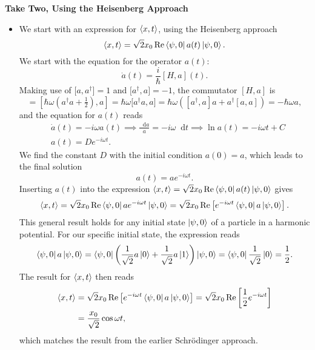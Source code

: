 \documentclass[11pt, a4paper]{article}
\newcommand{\diff}{\mathop{}\!\mathrm{d}} %
\newcommand{\Schro}{Schr\"{o}dinger\xspace}
\begin{document}
\textbf{Take Two, Using the Heisenberg Approach}
\begin{itemize}
	\item We start with an expression for $ \ev{x, t} $, using the Heisenberg approach
	\begin{equation*}
		\ev{x, t} = \sqrt{2}x_{0} \Re \bra{\psi, 0}a(t) \ket{\psi, 0}.
	\end{equation*}
	We start with the equation for the operator $ a(t) $: 
	\begin{equation*}
		\dot{a}(t) = \frac{i}{\hbar}[H, a](t).
	\end{equation*}
	Making use of $ \big[a, a^{\dagger}\big] = 1 $ and $ \big[ a^{\dagger}, a\big] = -1 $, the commutator $ [H, a] $ is
	\begin{equation*}
		[H, a] = [\hbar \omega (a^{\dagger}a + \tfrac{1}{2}), a] = \hbar \omega \big[a^{\dagger}a, a\big] = \hbar \omega \left([a^{\dagger}, a]a + a^{\dagger}[a, a]\right) = -\hbar \omega a,
	\end{equation*}
	and the equation for $ a(t) $ reads
	\begin{align*}
		&\dot{a}(t) = -i \omega a(t) \implies \frac{\diff a}{a} = -i\omega \diff t \implies \ln a(t) = -i\omega t + C\\
		&a(t) = De^{-i\omega t}.
	\end{align*}
	We find the constant $ D $ with the initial condition $ a(0) = a $, which leads to the final solution 
	\begin{equation*}
		a(t) = ae^{-i\omega t}.
	\end{equation*}
	Inserting $ a(t) $ into the expression $ \ev{x, t} = \sqrt{2}x_{0} \Re \bra{\psi, 0}a(t) \ket{\psi, 0} $ gives
	\begin{equation*}
		\ev{x, t} = \sqrt{2}x_{0} \Re \bra{\psi, 0}ae^{-i\omega t} \ket{\psi, 0} = \sqrt{2}x_{0} \Re \left[e^{-i\omega t} \bra{\psi, 0}a \ket{\psi, 0}\right].
	\end{equation*}
	This general result holds for any initial state $ \ket{\psi, 0} $ of a particle in a harmonic potential. For our specific initial state, the expression reads
	\begin{equation*}
		\bra{\psi, 0}a \ket{\psi, 0} = 	\bra{\psi, 0} \left(\frac{1}{\sqrt{2}}a \ket{0} + \frac{1}{\sqrt{2}}a\ket{1} \right) \ket{\psi, 0}  =	\bra{\psi, 0} \frac{1}{\sqrt{2}} \ket{0} = \frac{1}{2}.
	\end{equation*}
	The result for $ \ev{x, t} $ then reads
	\begin{align*}
		\ev{x, t} &= \sqrt{2}x_{0} \Re \left[e^{-i\omega t} \bra{\psi, 0}a \ket{\psi, 0}\right] = \sqrt{2}x_{0} \Re \left[\frac{1}{2} e^{-i\omega t}\right]\\
		&=\frac{x_{0}}{\sqrt{2}}\cos \omega t,
	\end{align*}
	which matches the result from the earlier \Schro approach. 
\end{itemize}
\end{document}
